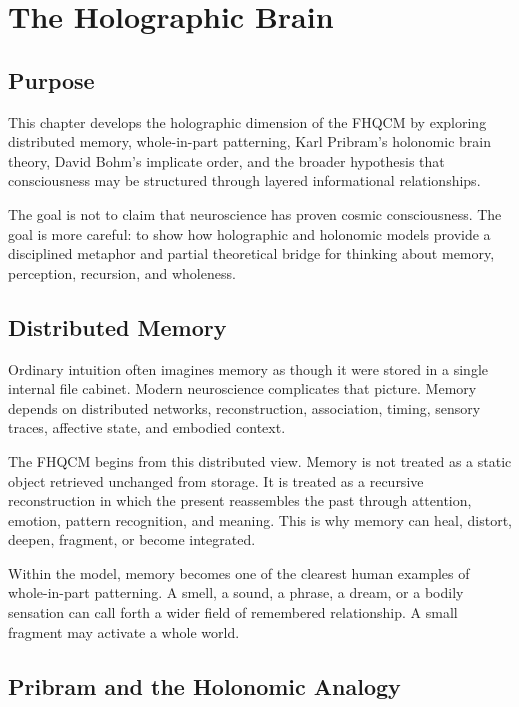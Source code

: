 \chapter{The Holographic Brain}

\section{Purpose}

This chapter develops the holographic dimension of the FHQCM by exploring distributed memory, whole-in-part patterning, Karl Pribram's holonomic brain theory, David Bohm's implicate order, and the broader hypothesis that consciousness may be structured through layered informational relationships.

The goal is not to claim that neuroscience has proven cosmic consciousness. The goal is more careful: to show how holographic and holonomic models provide a disciplined metaphor and partial theoretical bridge for thinking about memory, perception, recursion, and wholeness.


\section{Distributed Memory}

Ordinary intuition often imagines memory as though it were stored in a single internal file cabinet. Modern neuroscience complicates that picture. Memory depends on distributed networks, reconstruction, association, timing, sensory traces, affective state, and embodied context.

The FHQCM begins from this distributed view. Memory is not treated as a static object retrieved unchanged from storage. It is treated as a recursive reconstruction in which the present reassembles the past through attention, emotion, pattern recognition, and meaning. This is why memory can heal, distort, deepen, fragment, or become integrated.

Within the model, memory becomes one of the clearest human examples of whole-in-part patterning. A smell, a sound, a phrase, a dream, or a bodily sensation can call forth a wider field of remembered relationship. A small fragment may activate a whole world.

\section{Pribram and the Holonomic Analogy}

